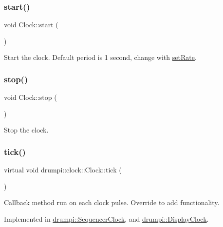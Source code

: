 \subsubsection{\texorpdfstring{start()}{start()}}
{\footnotesize\ttfamily void Clock\+::start (\begin{DoxyParamCaption}{ }\end{DoxyParamCaption})}

Start the clock. Default period is 1 second, change with \hyperlink{classdrumpi_1_1clock_1_1Clock_aa9727786f11c753730901fee28cde1ea}{set\+Rate}. \mbox{\label{classdrumpi_1_1clock_1_1Clock_a0b77c3e7f33eb7ae0f018e469d96a250}} 
\subsubsection{\texorpdfstring{stop()}{stop()}}
{\footnotesize\ttfamily void Clock\+::stop (\begin{DoxyParamCaption}{ }\end{DoxyParamCaption})}

Stop the clock. \mbox{\label{classdrumpi_1_1clock_1_1Clock_ade9259c06e6b90bbd92e155a2506d3a1}} 
\subsubsection{\texorpdfstring{tick()}{tick()}}
{\footnotesize\ttfamily virtual void drumpi\+::clock\+::\+Clock\+::tick (\begin{DoxyParamCaption}{ }\end{DoxyParamCaption})\hspace{0.3cm}{\ttfamily [pure virtual]}}

Callback method run on each clock pulse. Override to add functionality. 

Implemented in \hyperlink{classdrumpi_1_1SequencerClock_ac75142ddc2ee0dcd3c52d13e44b0d85f}{drumpi\+::\+Sequencer\+Clock}, and \hyperlink{classdrumpi_1_1DisplayClock_ae44b216f4788398ab3d67da7141fa88f}{drumpi\+::\+Display\+Clock}.

\mbox{\label{classdrumpi_1_1clock_1_1Clock_a2ff18f1fc7761649a9183676b57d543f}} 
